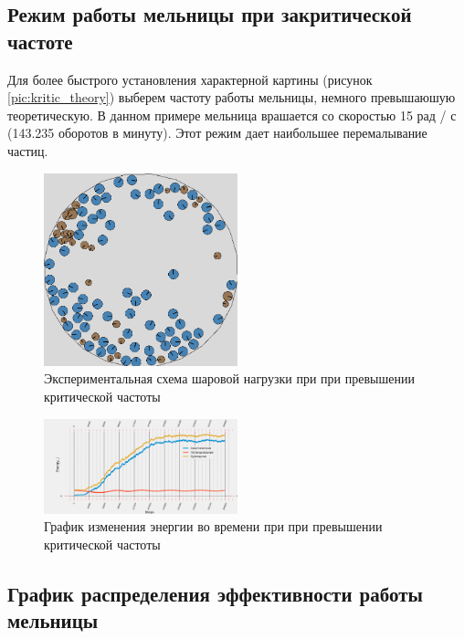\documentclass[utf8x, 14pt, oneside, a4paper]{article}
\begin{document}
\subsection{Режим работы мельницы при закритической частоте}

Для более быстрого установления характерной картины (рисунок \ref{pic:kritic_theory}) выберем частоту работы мельницы, немного превышаюшую теоретическую.
В данном примере мельница врашается со скоростью 15 рад / с (143.235 оборотов в минуту).
Этот режим дает наибольшее перемалывание частиц.

\begin{figure}[H]
	\centering
	\includegraphics[width=0.5\textwidth]{kritic_result} 
	\caption{Экспериментальная схема шаровой нагрузки при при превышении критической частоты}
	\label{pic:kritic_result}
\end{figure} 

\begin{figure}[H]
	\centering
	\includegraphics[width=0.5\textwidth]{kritic_energy} 
	\caption{График изменения энергии во времени при при превышении критической частоты}
	\label{pic:kritic_energy}
\end{figure} 

\subsection{График распределения эффективности работы мельницы}
\end{document}
